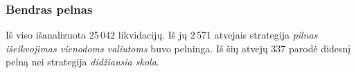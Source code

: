 \documentclass[]{VUMIFTemplateClass}
\begin{document}



\subsubsection{Bendras pelnas}
\label{sec:drain_bendras_pelnas}

Iš viso išanalizuota 25\,042 likvidacijų. Iš jų 2\,571 atvejais strategija \textit{pilnas išeikvojimas vienodoms valiutoms} buvo pelninga. Iš šių atvejų 337 parodė didesnį pelną nei strategija \textit{didžiausia skola}.
\end{document}
